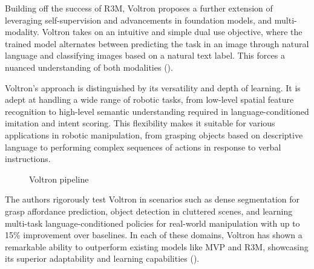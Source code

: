 \documentclass[
  letterpaper,
  numbers=noenddot,
  DIV=11]{scrreprt}
\theoremstyle{definition}
\theoremstyle{plain}
\theoremstyle{plain}
\theoremstyle{remark}
\begin{document}
Building off the success of R3M, Voltron proposes a further extension of
leveraging self-supervision and advancements in foundation models, and
multi-modality. Voltron takes on an intuitive and simple dual use
objective, where the trained model alternates between predicting the
task in an image through natural language and classifying images based
on a natural text label. This forces a nuanced understanding of both
modalities ().

Voltron's approach is distinguished by its versatility and depth of
learning. It is adept at handling a wide range of robotic tasks, from
low-level spatial feature recognition to high-level semantic
understanding required in language-conditioned imitation and intent
scoring. This flexibility makes it suitable for various applications in
robotic manipulation, from grasping objects based on descriptive
language to performing complex sequences of actions in response to
verbal instructions.

\begin{figure}


\caption{\label{fig-voltron-pipeline}Voltron pipeline}

\end{figure}%

The authors rigorously test Voltron in scenarios such as dense
segmentation for grasp affordance prediction, object detection in
cluttered scenes, and learning multi-task language-conditioned policies
for real-world manipulation with up to 15\% improvement over baselines.
In each of these domains, Voltron has shown a remarkable ability to
outperform existing models like MVP and R3M, showcasing its superior
adaptability and learning capabilities
().
\end{document}
